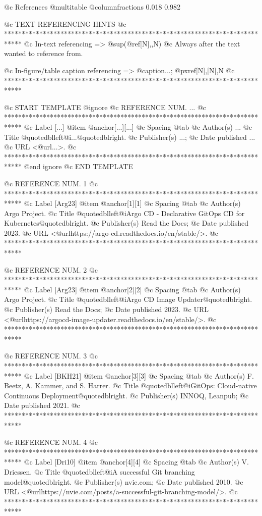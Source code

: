 @c References
@multitable @columnfractions 0.018 0.982


@c TEXT REFERENCING HINTS
@c *****************************************************************************
@c In-text referencing => @sup{(@ref{[N],,N})}
@c Always after the text wanted to reference from.

@c In-figure/table caption referencing => @caption{...; @pxref{[N],[N],N}}
@c *****************************************************************************


@c START TEMPLATE
@ignore
@c REFERENCE NUM. ...
@c *****************************************************************************
@c Label [...]
@item @anchor{[...]}[...]
@c Spacing
@tab
@c Author(s)
...
@c Title
@quotedblleft{}@i{...}@quotedblright{}.
@c Publisher(s)
...;
@c Date published
...
@c URL
<@url{...}>.
@c *****************************************************************************
@end ignore
@c END TEMPLATE


@c REFERENCE NUM. 1
@c *****************************************************************************
@c Label [Arg23]
@item @anchor{[1]}[1]
@c Spacing
@tab
@c Author(s)
Argo Project.
@c Title
@quotedblleft{}@i{Argo CD - Declarative GitOps CD for Kubernetes}@quotedblright{}.
@c Publisher(s)
Read the Docs;
@c Date published
2023.
@c URL
<@url{https://argo-cd.readthedocs.io/en/stable/}>.
@c *****************************************************************************

@c REFERENCE NUM. 2
@c *****************************************************************************
@c Label [Arg23]
@item @anchor{[2]}[2]
@c Spacing
@tab
@c Author(s)
Argo Project.
@c Title
@quotedblleft{}@i{Argo CD Image Updater}@quotedblright{}.
@c Publisher(s)
Read the Docs;
@c Date published
2023.
@c URL
<@url{https://argocd-image-updater.readthedocs.io/en/stable/}>.
@c *****************************************************************************

@c REFERENCE NUM. 3
@c *****************************************************************************
@c Label [BKH21]
@item @anchor{[3]}[3]
@c Spacing
@tab
@c Author(s)
F. Beetz, A. Kammer, and S. Harrer.
@c Title
@quotedblleft{}@i{GitOps: Cloud-native Continuous Deployment}@quotedblright{}.
@c Publisher(s)
INNOQ, Leanpub;
@c Date published
2021.
@c *****************************************************************************

@c REFERENCE NUM. 4
@c *****************************************************************************
@c Label [Dri10]
@item @anchor{[4]}[4]
@c Spacing
@tab
@c Author(s)
V. Driessen.
@c Title
@quotedblleft{}@i{A successful Git branching model}@quotedblright{}.
@c Publisher(s)
nvie.com;
@c Date published
2010.
@c URL
<@url{https://nvie.com/posts/a-successful-git-branching-model/}>.
@c *****************************************************************************

